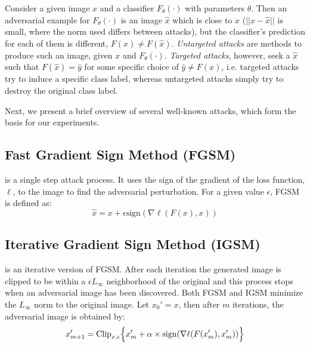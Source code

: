 Consider a given image $x$ and a classifier $F_\theta(\cdot)$ with parameters $\theta$.
Then an adversarial example for $F_\theta(\cdot)$ is an image $\hat{x}$ which is close
to $x$ (\ie $||x-\hat{x}||$ is small, where the norm used differs between attacks),  but the classifier's prediction for each of them is different, \ie $F(x) \neq F(\hat{x})$. 
\textit{Untargeted attacks} are  methods to produce such an image, given $x$ and $F_\theta(\cdot)$. 
\emph{Targeted attacks}, however, seek a $\hat{x}$ such that $F(\hat{x}) = \hat{y}$ for some specific choice of $\hat{y} \neq F(x)$, i.e. targeted attacks try to induce a specific class label, whereas untargeted attacks simply try to destroy the original class label.

Next, we present a brief overview of several well-known attacks, which form the basis for our experiments.

\subsection{Fast Gradient Sign Method (FGSM)}
\cite{Goodfellow2014ExplainingAH} is a single step attack process.
It uses the sign of the gradient of the loss function,  $\ell$,  \wrt to the image to find the adversarial perturbation. 
For a given value $\epsilon$, FGSM is defined as:
\begin{equation}
\hat{x} = x + \epsilon \text{sign} (\nabla \ell (F(x),x))
\end{equation}

\subsection{Iterative Gradient Sign Method (IGSM)} 
\cite{Kurakin2016AdversarialEI} is an iterative version of FGSM. After each iteration the generated image is clipped to be within a $\epsilon L_\infty$ neighborhood of the original and this process stops when an adversarial image has been discovered. 
Both FGSM and IGSM minimize the $L_\infty$ norm \wrt to the original image. Let $x_0' = x$, then after $m$ iterations, the adversarial image is obtained by:
\begin{equation}
x_{m+1}' = \text{Clip}_{x,\epsilon} \Bigl\{x_m' + \alpha \times \text{sign}(\nabla \ell (F(x'_m),x'_m))  \Bigr\} 
\end{equation}

